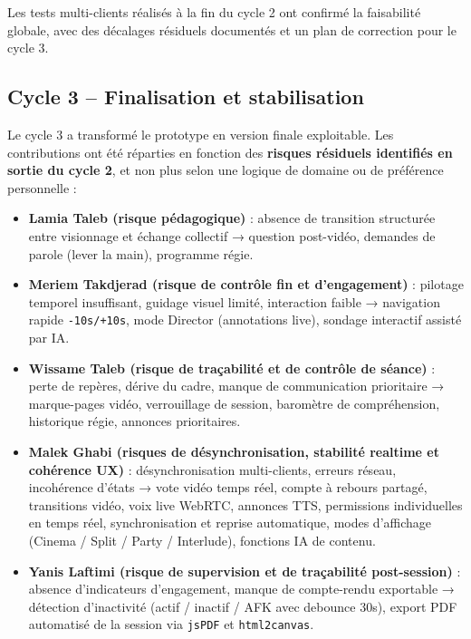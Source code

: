 \documentclass[11pt,a4paper]{report}
\begin{document}
Les tests multi-clients réalisés à la fin du cycle 2 ont confirmé la faisabilité globale, avec des décalages résiduels documentés et un plan de correction pour le cycle 3.

\subsection{Cycle 3 -- Finalisation et stabilisation}

Le cycle 3 a transformé le prototype en version finale exploitable. Les contributions ont été réparties en fonction des \textbf{risques résiduels identifiés en sortie du cycle 2}, et non plus selon une logique de domaine ou de préférence personnelle :

\begin{itemize}
    \item \textbf{Lamia Taleb (risque pédagogique)} : absence de transition structurée entre visionnage et échange collectif → question post-vidéo, demandes de parole (lever la main), programme régie.
    \item \textbf{Meriem Takdjerad (risque de contrôle fin et d'engagement)} : pilotage temporel insuffisant, guidage visuel limité, interaction faible → navigation rapide \texttt{-10s/+10s}, mode Director (annotations live), sondage interactif assisté par IA.
    \item \textbf{Wissame Taleb (risque de traçabilité et de contrôle de séance)} : perte de repères, dérive du cadre, manque de communication prioritaire → marque-pages vidéo, verrouillage de session, baromètre de compréhension, historique régie, annonces prioritaires.
    \item \textbf{Malek Ghabi (risques de désynchronisation, stabilité realtime et cohérence UX)} : désynchronisation multi-clients, erreurs réseau, incohérence d'états → vote vidéo temps réel, compte à rebours partagé, transitions vidéo, voix live WebRTC, annonces TTS, permissions individuelles en temps réel, synchronisation et reprise automatique, modes d'affichage (Cinema / Split / Party / Interlude), fonctions IA de contenu.
    \item \textbf{Yanis Laftimi (risque de supervision et de traçabilité post-session)} : absence d'indicateurs d'engagement, manque de compte-rendu exportable → détection d'inactivité (actif / inactif / AFK avec debounce 30s), export PDF automatisé de la session via \texttt{jsPDF} et \texttt{html2canvas}.
\end{itemize}

\end{document}
